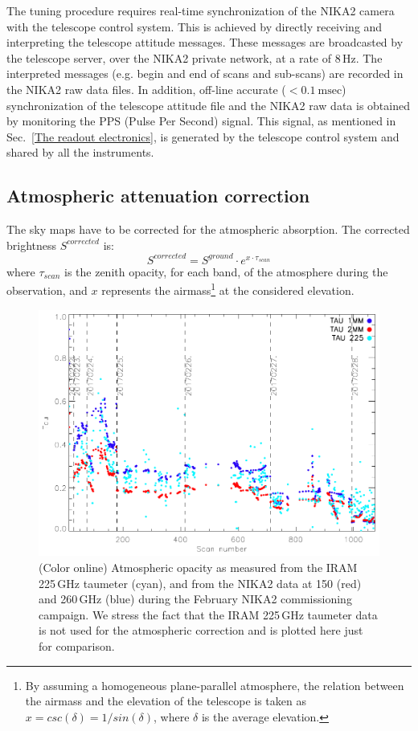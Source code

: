 \documentclass[]{aa} %
\begin{document}
The tuning procedure requires real-time synchronization of the NIKA2 camera with the telescope control system. This is achieved by directly receiving and interpreting the telescope attitude messages. These messages are broadcasted by the telescope server, over the NIKA2 private network, at a rate of 8\,Hz. The interpreted messages (e.g. begin and end of scans and sub-scans) are recorded in the NIKA2 raw data files. In addition, off-line accurate ($< 0.1~ \textrm{msec}$) synchronization of the telescope attitude file and the NIKA2 raw data is obtained by monitoring the PPS (Pulse Per Second) signal. This signal, as mentioned in Sec.~\ref{The readout electronics}, is generated by the telescope control system and shared by all the instruments.


\subsection{Atmospheric attenuation correction}
\label{Atmospheric attenuation correction}


The sky maps have to be corrected for the atmospheric absorption. The corrected brightness $S^{corrected}$ is:
\begin{equation}\label{eq:opa}
S^{corrected} =  S^{ground} \cdot e^{ x \cdot \tau_{scan}}
\end{equation}
where $\tau_{scan}$ is the zenith opacity, for each band, of the atmosphere during the
observation, and $x$ represents the airmass\footnote{By assuming a
  homogeneous plane-parallel atmosphere, the relation between the
  airmass and the elevation of the telescope is taken as $x =
  csc(\delta)=1/sin(\delta)$, where $\delta$ is the average
  elevation.} at the considered elevation.

\begin{figure}
\includegraphics[scale=0.55]{./opacity_evol_run22.pdf}
\caption{(Color online) Atmospheric opacity as measured from the IRAM 225\,GHz taumeter (cyan), and from the NIKA2 data at 150 (red) and 260\,GHz (blue) during the February NIKA2 commissioning campaign. We stress the fact that the IRAM 225\,GHz taumeter data is not used for the atmospheric correction and is plotted here just for comparison.
  \label{fig:taumeas}}
\end{figure}
\end{document}
